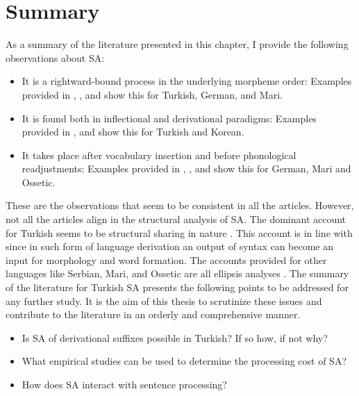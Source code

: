 \section{Summary}

As a summary of the literature presented in this chapter, I provide the following observations about SA:

\begin{itemize}
    \item It is a rightward-bound process in the underlying morpheme order: Examples provided in \cite{kabak2007turkish}, \cite{pounder2006broken}, and \cite{guseva2017postsyntactic} show this for Turkish, German, and Mari.
    
    \item It is found both in inflectional and derivational paradigms: Examples provided in \cite{akkucs2016suspended}, and \cite{yoon2017lexical} show this for Turkish and Korean.

    \item It takes place after vocabulary insertion and before phonological readjustments: Examples provided in  \cite{pounder2006broken}, \cite{guseva2017postsyntactic}, and \cite{erschler2018suspended} show this for German, Mari and Ossetic.
\end{itemize}

These are the observations that seem to be consistent in all the articles. However, not all the articles align in the structural analysis of SA. The dominant account for Turkish seems to be structural sharing in nature \citep{orgun1995flat,kornfilt1996some,broadwell2008turkish,kornfilt2012revisiting}. This account is in line with \cite{ackema2004beyond,kunduraci2016morphology, bruening2018word} since in such form of language derivation an output of syntax can become an input for morphology and word formation. The accounts provided for other languages like Serbian, Mari, and Ossetic are all ellipsis analyses \citep{despic2017suspended,guseva2017postsyntactic,erschler2018suspended}. The summary of the literature for Turkish SA presents the following points to be addressed for any further study. It is the aim of this thesis to scrutinize these issues and contribute to the literature in an orderly and comprehensive manner.

\begin{itemize}
    \item Is SA of derivational suffixes possible in Turkish? If so how, if not why?
    \item What empirical studies can be used to determine the processing cost of SA?
    \item How does SA interact with sentence processing?
\end{itemize}

